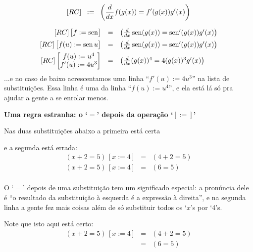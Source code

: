 \documentclass[oneside,12pt]{article}
\begin{document}
$$[RC] \;\; := \;\; \left( \frac{d}{dx} f(g(x)) = f'(g(x))g'(x) \right)$$

$$\begin{array}{rcl}
  [RC] \left [\begin{matrix}f := \operatorname{sen}\end{matrix}\right ] &=&
     \left( \frac{d}{dx} \operatorname{sen}(g(x)) = \operatorname{sen}'(g(x))g'(x) \right) \\[5pt]
  [RC] \left [\begin{matrix}f(u) := \operatorname{sen} u\end{matrix}\right ] &=&
     \left( \frac{d}{dx} \operatorname{sen}(g(x)) = \operatorname{sen}'(g(x))g'(x) \right) \\[5pt]
  [RC] \left [\begin{matrix}f(u) := u^4 \\ f'(u) := 4u^3 \end{matrix}\right ] &=&
     \left( \frac{d}{dx} (g(x))^4 = 4(g(x))^3g'(x) \right) \\
  \end{array}
$$
%
...e no caso de baixo acrescentamos uma linha ``$f'(u) := 4u^3$'' na
lista de substituições. Essa linha é uma  da
linha ``$f(u) := u^4$'', e ela está lá só pra ajudar a gente a se
enrolar menos.


\newpage



{\bf Uma regra estranha: o `$=$' depois da operação `$[:=]$'}

\ssk

Nas duas substituições abaixo a primeira está certa

e a segunda está errada:
%
$$\begin{array}{rll}
  (x + 2 = 5) \, [x:=4] &=& (4 + 2 = 5) \\
  (x + 2 = 5) \, [x:=4] &=& (6 = 5) \\
  \end{array}
$$

O `$=$' depois de uma substituição tem um significado especial: a
pronúncia dele é ``o resultado da substituição à esquerda é a
expressão à direita'', e na segunda linha a gente fez mais coisas além
de só substituir todos os `$x$'s por `4's.

Note que isto aqui está certo:
%
$$\begin{array}{rll}
  (x + 2 = 5) \, [x:=4] &=& (4 + 2 = 5) \\
                        &=& (6 = 5) \\
  \end{array}
$$
\end{document}
